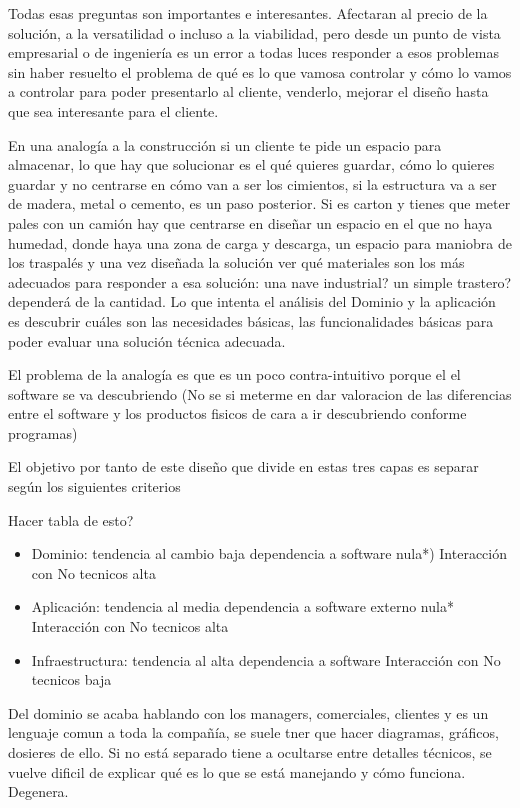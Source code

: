 Todas esas preguntas son importantes e interesantes. Afectaran al precio de la solución, a la versatilidad o incluso a la viabilidad, pero desde un punto de vista empresarial o de ingeniería es un error a todas luces responder a esos problemas sin haber resuelto el problema de qué es lo que vamosa controlar y cómo lo vamos a controlar para poder presentarlo al cliente, venderlo, mejorar el diseño hasta que sea interesante para el cliente.

En una analogía a la construcción si un cliente te pide un espacio para almacenar, lo que hay que solucionar es el qué quieres guardar, cómo lo quieres guardar y no centrarse en cómo van a ser los cimientos, si la estructura va a ser de madera, metal o cemento, es un paso posterior. Si es carton y tienes que meter pales con un camión hay que centrarse en diseñar un espacio en el que no haya humedad, donde haya una zona de carga y descarga, un espacio para maniobra de los traspalés y una vez diseñada la solución ver qué materiales son los más adecuados para responder a esa solución: una nave industrial? un simple trastero? dependerá de la cantidad. Lo que intenta el análisis del Dominio y la aplicación es descubrir cuáles son las necesidades básicas, las funcionalidades básicas para poder evaluar una solución técnica adecuada.

El problema de la analogía es que es un poco contra-intuitivo porque el el software se va descubriendo (No se si meterme en dar valoracion de las diferencias entre el software y los productos fisicos de cara a ir descubriendo conforme programas)

El objetivo por tanto de este diseño que divide en estas tres capas es separar según los siguientes criterios

Hacer tabla de esto?
\begin{itemize}
    \item Dominio:          tendencia al cambio baja    dependencia a software nula*)    Interacción con No tecnicos alta
    \item Aplicación:       tendencia al media          dependencia a software externo nula* Interacción con No tecnicos alta
    \item Infraestructura:  tendencia al alta           dependencia a software  Interacción con No tecnicos baja
\end{itemize}

Del dominio se acaba hablando con los managers, comerciales, clientes y es un lenguaje comun a toda la compañía, se suele tner que hacer diagramas, gráficos, dosieres de ello. Si no está separado tiene a ocultarse entre detalles técnicos, se vuelve dificil de explicar qué es lo que se está manejando y cómo funciona. Degenera.

